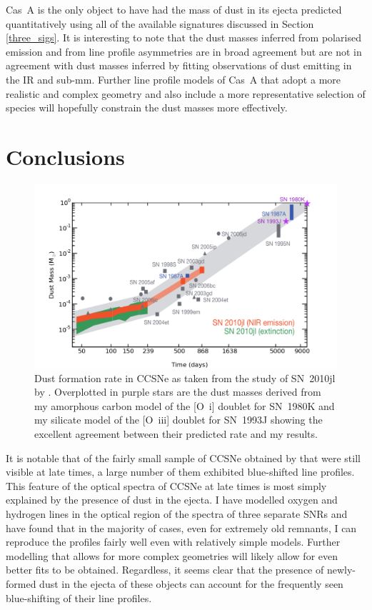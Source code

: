 Cas~A is the only object to have had the mass of dust in its ejecta predicted quantitatively using all of the available signatures discussed in Section \ref{three_sigs}.  It is interesting to note that the dust masses inferred from polarised emission and from line profile asymmetries are in broad agreement but are not in agreement with dust masses inferred by fitting observations of dust emitting in the IR and sub-mm.  Further line profile models of Cas~A that adopt a more realistic and complex geometry  and also include a more representative selection of species will hopefully constrain the dust masses more effectively.  

\section{Conclusions}

\begin{figure}
\centering
\includegraphics[scale=0.6,clip=true, trim=30 0 50 0]{chapters/chapter6/figs/test2.png}
\caption{Dust formation rate in CCSNe as taken from the study of SN~2010jl by \citet{Gall2014}.  Overplotted in purple stars are the dust masses derived from my amorphous carbon model of the [O~{\sc i}] doublet for SN~1980K and my silicate model of the [O~{\sc iii}] doublet for SN~1993J showing the excellent agreement between their predicted rate and my results.}
\label{dust_masses_gall}
\end{figure}

It is notable that of the fairly small sample of CCSNe obtained by \citet{Milisavljevic2012} that were still visible at late times, a large number of them exhibited blue-shifted line profiles.  This feature of the optical spectra of CCSNe at late times is most simply explained by the presence of dust in the ejecta.  I have modelled oxygen and hydrogen lines in the optical region of the spectra of three separate SNRs and have found that in the majority of cases, even for extremely old remnants, I can reproduce the profiles fairly well even with relatively simple models.  Further modelling that allows for more complex geometries will likely allow for even better fits to be obtained.  Regardless, it seems clear that the presence of newly-formed dust in the ejecta of these objects can account for the frequently seen blue-shifting of their line profiles.

